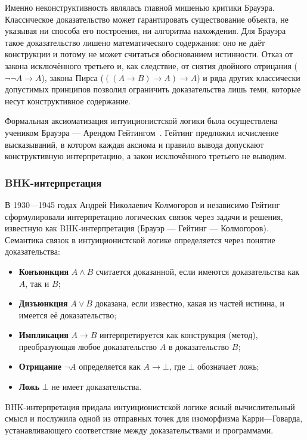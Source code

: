 \documentclass[14pt, russian]{scrartcl}
\begin{document}
Именно неконструктивность являлась главной мишенью критики Брауэра.
Классическое доказательство может гарантировать существование объекта, не
указывая ни способа его построения, ни алгоритма нахождения. Для Брауэра такое
доказательство лишено математического содержания: оно не даёт конструкции и
потому не может считаться обоснованием истинности. Отказ от закона исключённого
третьего и, как следствие, от снятия двойного отрицания ($\neg\neg A \rightarrow
A$), закона Пирса ($((A \rightarrow B) \rightarrow A) \rightarrow A$) и ряда
других классически допустимых принципов позволил ограничить доказательства лишь
теми, которые несут конструктивное содержание.

Формальная аксиоматизация интуиционистской логики была осуществлена учеником
Брауэра --- Арендом Гейтингом~\cite{Heyting1956}. Гейтинг предложил исчисление
высказываний, в котором каждая аксиома и правило вывода допускают конструктивную
интерпретацию, а закон исключённого третьего не выводим.

\subsubsection{BHK-интерпретация}
В 1930---1945 годах Андрей Николаевич Колмогоров и независимо
Гейтинг~\cite{Heyting1956}
сформулировали интерпретацию логических связок через задачи и решения,
известную как BHK-интерпретация (Брауэр --- Гейтинг --- Колмогоров). Семантика
связок в интуиционистской логике определяется через понятие доказательства:
\begin{itemize}
    \item \textbf{Конъюнкция} \( A \land B \) считается доказанной, если
      имеются доказательства как \( A \), так и \( B \);
    \item \textbf{Дизъюнкция} \( A \lor B \) доказана, если известно, какая из
      частей истинна, и имеется её доказательство;
    \item \textbf{Импликация} \( A \rightarrow B \) интерпретируется как
      конструкция (метод), преобразующая любое доказательство \( A \) в
      доказательство \( B \);
    \item \textbf{Отрицание} \( \neg A \) определяется как \( A \rightarrow
      \bot \), где \( \bot \) обозначает ложь;
    \item \textbf{Ложь} \( \bot \) не имеет доказательства.
\end{itemize}
BHK-интерпретация придала интуиционистской логике ясный вычислительный смысл и
послужила одной из отправных точек для изоморфизма Карри---Говарда,
устанавливающего соответствие между доказательствами и программами.
\end{document}

